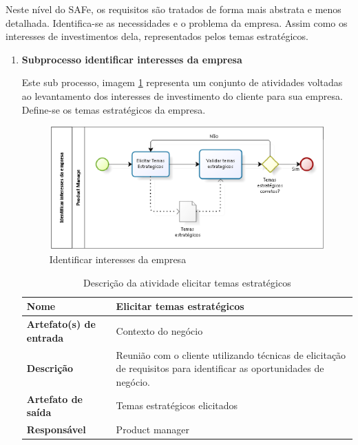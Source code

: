 Neste nível do SAFe, os requisitos são tratados de forma mais abstrata e menos detalhada. Identifica-se as necessidades e o problema da empresa. Assim como os interesses de investimentos dela, representados pelos temas estratégicos.
\begin{enumerate}
\item \textbf{Subprocesso identificar interesses da empresa}

Este sub processo, imagem \ref{processoInteresses} representa um conjunto de atividades voltadas ao levantamento dos interesses de investimento do cliente para sua empresa. Define-se os temas estratégicos da empresa.

\begin{figure}[H]
    \centering
    \caption{Identificar interesses da empresa}
    \label{processoInteresses}
    \includegraphics[keepaspectratio=true,scale=0.8]{figuras/processoInteresses.eps}
\end{figure}

\begin{table}[H]
    \centering
    \label{descricaoAtividades1}
    \caption{Descrição da atividade elicitar temas estratégicos}
        \begin{tabular}{|l|p{10cm}|}
        \hline
        \textbf{Nome} & Elicitar temas estratégicos \\
        \hline
        \textbf{Artefato(s) de entrada} & Contexto do negócio \\
        \hline
        \textbf{Descrição} & Reunião com o cliente utilizando técnicas de elicitação de requisitos para identificar as oportunidades de negócio. \\
        \hline
        \textbf{Artefato de saída} & Temas estratégicos elicitados \\
        \hline
        \textbf{Responsável} & Product manager\\
        \hline
    \end{tabular}
\end{table}


\end{enumerate}

